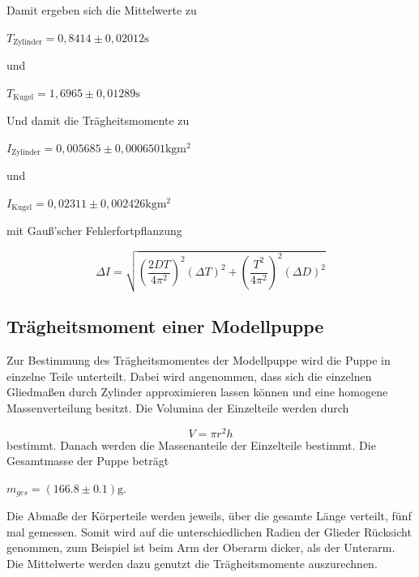  Damit ergeben sich die Mittelwerte zu 

\begin{center}
  $T_{\text{Zylinder}} = 0,8414 \pm 0,02012 \si{\second} $
\end{center}

 und

\begin{center}
  $ T_{\text{Kugel}} = 1,6965 \pm 0,01289 \si{\second} $
\end{center}

 Und damit die Trägheitsmomente zu

\begin{center}
  $ I_{\text{Zylinder}} = 0,005685 \pm 0,0006501 \si{\kilogram\meter^2} $ 
\end{center}

 und

\begin{center}
  $ I_{\text{Kugel}} = 0,02311 \pm 0,002426 \si{\kilogram\meter^2} $
\end{center}

 mit Gauß'scher Fehlerfortpflanzung

\begin{equation}
  \Delta I = \sqrt{ (\frac{2DT}{4\pi^2})^2  (\Delta T)^2 + (\frac{T^2}{4\pi^2})^2 (\Delta D)^2}
  \label{fig:Fehlerfortpflanzung}
\end{equation}


\subsection{Trägheitsmoment einer Modellpuppe}
\label{sec:Trägheitsmoment einer Modellpuppe}

Zur Bestimmung des Trägheitsmomentes der Modellpuppe wird die Puppe in einzelne Teile unterteilt. Dabei wird angenommen,
dass sich die einzelnen Gliedmaßen durch Zylinder approximieren lassen können und eine homogene Massenverteilung besitzt. Die
Volumina der Einzelteile werden durch

\begin{equation}
  V = \pi r^2h
  \label{eqn:Volumen}
\end{equation}
 bestimmt. Danach werden die Massenanteile der Einzelteile bestimmt. Die Gesamtmasse der Puppe beträgt 

\begin{center}
  $m_{ges} = (166.8\pm 0.1)\si{\gram}$.
\end{center}


Die Abmaße der Körperteile werden jeweils, über die gesamte Länge verteilt, fünf mal gemessen. Somit wird auf die unterschiedlichen
Radien der Glieder Rücksicht genommen, zum Beispiel ist beim Arm der Oberarm dicker, als der Unterarm. Die Mittelwerte werden dazu genutzt die
Trägheitsmomente auszurechnen.

